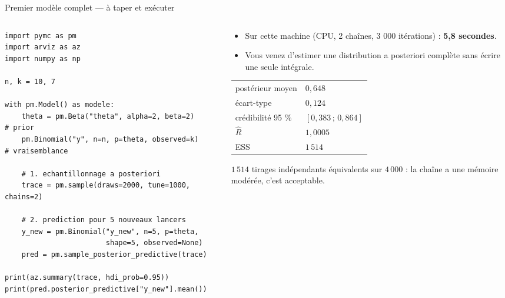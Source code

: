 \begin{frame}[fragile]{Premier modèle complet — à taper et exécuter}
\begin{columns}[t]
\begin{column}{0.53\textwidth}
\begin{codebox}
\begin{lstlisting}
import pymc as pm
import arviz as az
import numpy as np

n, k = 10, 7

with pm.Model() as modele:
    theta = pm.Beta("theta", alpha=2, beta=2)      # prior
    pm.Binomial("y", n=n, p=theta, observed=k)     # vraisemblance

    # 1. echantillonnage a posteriori
    trace = pm.sample(draws=2000, tune=1000, chains=2)

    # 2. prediction pour 5 nouveaux lancers
    y_new = pm.Binomial("y_new", n=5, p=theta,
                        shape=5, observed=None)
    pred = pm.sample_posterior_predictive(trace)

print(az.summary(trace, hdi_prob=0.95))
print(pred.posterior_predictive["y_new"].mean())
\end{lstlisting}
\end{codebox}
\end{column}
\begin{column}{0.45\textwidth}
\begin{abox}
\begin{itemize}
  \item Sur cette machine (CPU, 2 chaînes, 3 000 itérations) :
        \textbf{5,8 secondes}.
  \item Vous venez d'estimer une distribution a posteriori complète
        sans écrire une seule intégrale.
\end{itemize}
\end{abox}
\begin{kbox}
\begin{tabular}{@{}ll@{}}
postérieur moyen & $0{,}648$ \\
écart-type & $0{,}124$ \\
crédibilité 95 \% & $[0{,}383 \,;\, 0{,}864]$ \\
$\hat R$ & $1{,}0005$ \\
ESS & $1\,514$ \\
\end{tabular}
\vspace{1mm}

\footnotesize $1\,514$ tirages indépendants équivalents sur $4\,000$ : la chaîne
a une mémoire modérée, c'est acceptable.
\end{kbox}
\end{column}
\end{columns}
\end{frame}

